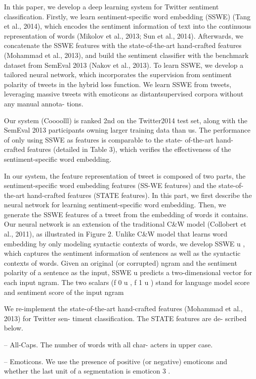 In this paper, we develop a deep learning system for Twitter
sentiment classification. Firstly, we learn sentiment-specific word
embedding (SSWE) (Tang et al., 2014), which encodes the sentiment
information of text into the continuous representation of words
(Mikolov et al., 2013; Sun et al., 2014). Afterwards, we concatenate
the SSWE features with the state-of-the-art hand-crafted features
(Mohammad et al., 2013), and build the sentiment classifier with the
benchmark dataset from SemEval 2013 (Nakov et al., 2013). To learn
SSWE, we develop a tailored neural network, which incorporates the
supervision from sentiment polarity of tweets in the hybrid loss
function. We learn SSWE from tweets, leveraging massive tweets with
emoticons as distantsupervised corpora without any manual annota-
tions.

Our system (Coooolll) is ranked 2nd on the Twitter2014 test set, along
with the SemEval 2013 participants owning larger training data than
us. The performance of only using SSWE as features is comparable to
the state- of-the-art hand-crafted features (detailed in Table 3),
which verifies the effectiveness of the sentiment-specific word
embedding.

In our system, the feature representation of tweet is composed of two
parts, the sentiment-specific word embedding features (SS-WE features)
and the state-of-the-art hand-crafted features (STATE features).  In
this part, we first describe the neural network for learning
sentiment-specific word embedding.  Then, we generate the SSWE
features of a tweet from the embedding of words it contains.  Our
neural network is an extension of the traditional C\&W model
(Collobert et al., 2011), as illustrated in Figure 2. Unlike C\&W
model that learns word embedding by only modeling syntactic contexts
of words, we develop SSWE u , which captures the sentiment information
of sentences as well as the syntactic contexts of words. Given an
original (or corrupted) ngram and the sentiment polarity of a sentence
as the input, SSWE u predicts a two-dimensional vector for each
input ngram.  The two scalars (f 0 u , f 1 u ) stand for language
model score and sentiment score of the input ngram

We re-implement the state-of-the-art hand-crafted
features (Mohammad et al., 2013) for Twitter sen-
timent classification. The STATE features are de-
scribed below.

-- All-Caps. The number of words with all char-
acters in upper case.

-- Emoticons. We use the presence of positive
(or negative) emoticons and whether the last
unit of a segmentation is emoticon 3 .

